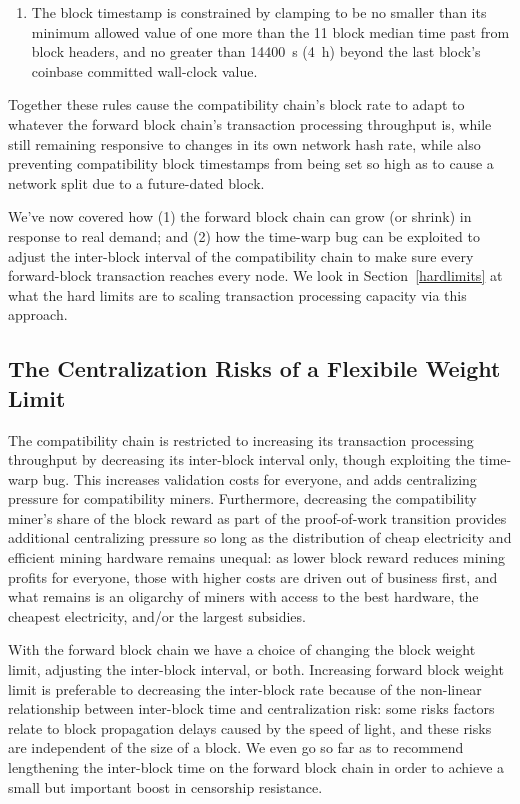 \begin{enumerate}
\begin{enumerate}
\begin{enumerate}
      \item

        The block timestamp is constrained by clamping to be no
        smaller than its minimum allowed value of one more than
        the \num{11} block median time past from block headers, and no
        greater than \SI{14400}{\second} (\SI{4}{\hour}) beyond the
        last block's coinbase committed wall-clock
        value.

    \end{enumerate}
\end{enumerate}

Together these rules cause the compatibility chain's block rate to
adapt to whatever the forward block chain's transaction processing
throughput is, while still remaining responsive to changes in its own
network hash rate, while also preventing compatibility block
timestamps from being set so high as to cause a network split due to a
future-dated block.

We've now covered how (1) the forward block chain can grow (or shrink)
in response to real demand; and (2) how the time-warp bug can be
exploited to adjust the inter-block interval of the compatibility
chain to make sure every forward-block transaction reaches every node.
We look in Section~\ref{hardlimits} at what the hard limits are to
scaling transaction processing capacity via this approach.

\subsection{The Centralization Risks of a Flexibile Weight Limit}

The compatibility chain is restricted to increasing its transaction
processing throughput by decreasing its inter-block interval only,
though exploiting the time-warp bug.  This increases validation costs
for everyone, and adds centralizing pressure for compatibility miners.
Furthermore, decreasing the compatibility miner's share of the block
reward as part of the proof-of-work transition provides additional
centralizing pressure so long as the distribution of cheap electricity
and efficient mining hardware remains unequal: as lower block reward
reduces mining profits for everyone, those with higher costs are
driven out of business first, and what remains is an oligarchy of
miners with access to the best hardware, the cheapest electricity,
and/or the largest subsidies.

With the forward block chain we have a choice of changing the block
weight limit, adjusting the inter-block interval, or both.  Increasing
forward block weight limit is preferable to decreasing the inter-block
rate because of the non-linear relationship between inter-block time
and centralization risk: some risks factors relate to block
propagation delays caused by the speed of light, and these risks are
independent of the size of a block.  We even go so far as to recommend
lengthening the inter-block time on the forward block chain in order
to achieve a small but important boost in censorship resistance.


\end{enumerate}
